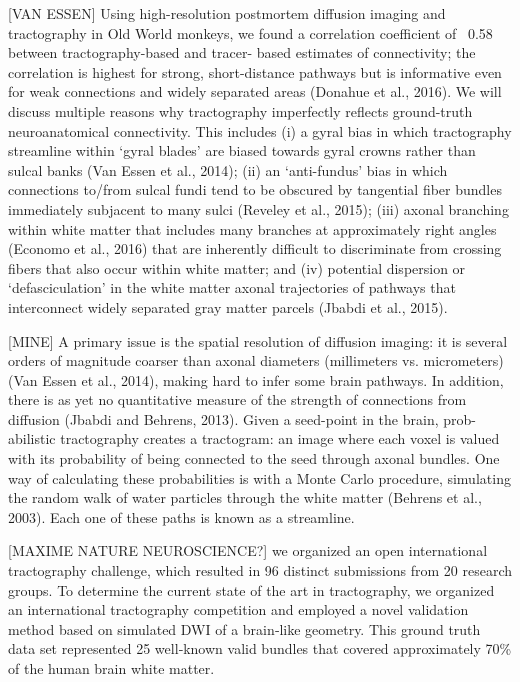 [VAN ESSEN]
Using high-resolution postmortem diffusion imaging and tractography in Old World monkeys, we found a correlation coefficient of ~0.58 between tractography-based and tracer- based estimates of connectivity;
the correlation is highest for strong, short-distance pathways but is informative even for weak connections and widely separated areas (Donahue et al., 2016).
We will discuss multiple reasons why tractography imperfectly reflects ground-truth neuroanatomical connectivity.
This includes
(i) a gyral bias in which tractography streamline within ‘gyral blades’ are biased towards gyral crowns rather than sulcal banks (Van Essen et al., 2014);
(ii) an ‘anti-fundus’ bias in which connections to/from sulcal fundi tend to be obscured by tangential fiber bundles immediately subjacent to many sulci (Reveley et al., 2015);
(iii) axonal branching within white matter that includes many branches at approximately right angles (Economo et al., 2016) that are inherently difficult to discriminate from crossing fibers that also occur within white matter;
and (iv) potential dispersion or ‘defasciculation’ in the white matter axonal trajectories of pathways that interconnect widely separated gray matter parcels (Jbabdi et al., 2015).


[MINE]
A primary issue is the spatial resolution of diffusion imaging:
it is several orders of magnitude coarser than axonal diameters (millimeters vs. micrometers) (Van Essen et al., 2014), making hard to infer some brain pathways.
In addition, there is as yet no quantitative measure of the strength of connections from diffusion (Jbabdi and Behrens, 2013).
Given a seed-point in the brain, prob- abilistic tractography creates a tractogram:
an image where each voxel is valued with its probability of being connected to the seed through axonal bundles.
One way of calculating these probabilities is with a Monte Carlo procedure, simulating the random walk of water particles through the white matter (Behrens et al., 2003).
Each one of these paths is known as a streamline.

[MAXIME NATURE NEUROSCIENCE?]
we organized an open international tractography challenge, which resulted in 96 distinct submissions from 20 research groups.
To determine the current state of the art in tractography, we organized  an  international tractography competition and employed a novel validation method based on simulated DWI of a brain‐like geometry.
This ground truth data set represented 25 well‐known valid bundles that covered approximately 70\% of the human brain white matter.

